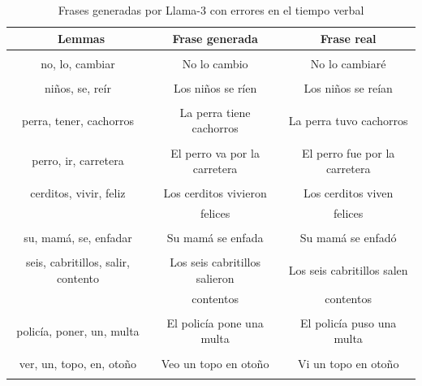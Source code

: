 \documentclass[11pt,spanish,listoffigures,listoftables]{tfgetsinf}
\begin{document}
\begin{table}[!h]
\caption{Frases generadas por Llama-3 con errores en el tiempo verbal}
\begin{center}
\begin{tabular}{ c | c | c }
	\ Lemmas & Frase generada & Frase real \\
	\hline
	\hline
	 & & \\
	 no, lo, cambiar & No lo cambio & No lo cambiaré  \\
	 & & \\
	niños, se, reír & Los niños se ríen & Los niños se reían\\
	 & & \\
	perra, tener, cachorros & La perra tiene cachorros & La perra tuvo cachorros \\
	 & & \\
	perro, ir, carretera & El perro va por la carretera & El perro fue por la carretera \\
	 & & \\
	cerditos, vivir, feliz & Los cerditos vivieron & Los cerditos viven \\
	 & felices & felices \\
	 & & \\
	su, mamá, se, enfadar & Su mamá se enfada & Su mamá se enfadó \\
	 & & \\
	seis, cabritillos, salir, contento & Los seis cabritillos salieron  & Los seis cabritillos salen  \\
	 & contentos & contentos \\
	 & & \\
	policía, poner, un, multa & El policía pone una multa & El policía puso una multa \\
	 & & \\
	ver, un, topo, en, otoño & Veo un topo en otoño & Vi un topo en otoño \\
	 & & \\

\end{tabular}
\end{center}
\label{tab:erroresTiempoVerbal}
\end{table}
\end{document}
